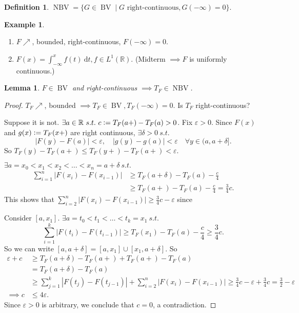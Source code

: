 \documentclass{report}
\newcommand{\R}{\mathbb{R}}
\newcommand{\st}{\ s.t.\ }
\def \BV {\operatorname{BV}}
\def \NBV {\operatorname{NBV}}
\newcommand{\df}{\ \mathrm{d}}
\newcommand{\defeq}{\vcentcolon=}
\newtheorem{lemma}[theorem]{Lemma}
\theoremstyle{definition}
\newtheorem{definition}[theorem]{Definition}
\newtheorem{example}[theorem]{Example}
\theoremstyle{remark}
\newcommand{\fnl}{\parbox[t]{0\linewidth}{}}
\begin{document}
\begin{definition}
	$\NBV = \{G \in \BV \mid G \text{ right-continuous}, G(-\infty) = 0\}$.
\end{definition}
\begin{example}\fnl
	\begin{enumerate}
		\item $F \nearrow$, bounded, right-continuous, $F(-\infty) = 0$.
		\item $F(x) = \int_{-\infty}^x f(t)\df t, f \in L^1(\R)$. (Midterm $\implies F$ is uniformly continuous.)
	\end{enumerate}
\end{example}
\begin{lemma}
	$F \in \operatorname{BV}$ and right-continuous $\implies T_F \in \operatorname{NBV}$.
\end{lemma}
\begin{proof}
	$T_F \nearrow$, bounded $\implies T_F \in \operatorname{BV}, T_F(-\infty) = 0$. Is $T_F$ right-continuous?

	Suppose it is not. $\exists a \in \R \st c \defeq T_F(a+) - T_F(a) > 0$. Fix $\varepsilon > 0$. Since $F(x)$ and $g(x) \defeq T_F(x+)$ are right continuous, $\exists \delta > 0 \st$ \[
		|F(y) - F(a)| < \varepsilon, \quad |g(y) - g(a)| < \varepsilon\quad \forall y \in (a, a + \delta].
	\]
	So $T_F(y) - T_F(a+) \leq T_F(y+) - T_F(a+) < \varepsilon$.

	$\exists a = x_0 < x_1 < x_2 < \ldots < x_n = a + \delta \st$
	\begin{align*}
		\sum_{i=1}^n |F(x_i) - F(x_{i-1})| & \geq T_F(a + \delta) - T_F(a) - \frac{c}{4} \\
		& \geq T_F(a+) - T_F(a) - \frac{c}{4} = \frac{3}{4}c.
	\end{align*} 
	This shows that $\sum_{i=2}^n |F(x_i) - F(x_{i-1})| \geq \frac{3}{4}c - \varepsilon$ since

	Consider $[a, x_1]$. $\exists a = t_0 < t_1 < \ldots < t_k = x_1 \st$ \[
		\sum_{i=1}^k |F(t_i) - F(t_{i-1})| \geq T_F(x_1) - T_F(a) - \frac{c}{4} \geq \frac{3}{4}c.
	\]
	So we can write $[a, a + \delta] = [a, x_1] \cup [x_1, a + \delta]$. So \begin{align*}
		\varepsilon + c & \geq T_F(a + \delta) - T_F(a+) + T_F(a+) - T_F(a) \\
						& = T_F(a + \delta) - T_F(a) \\
						& \geq \sum_{j=1}^k |F(t_j) - F(t_{j-1})| + \sum_{i=2}^n |F(x_i) - F(x_{i-1})| \geq \frac{3}{4}c - \varepsilon + \frac{3}{4}c = \frac{3}{2} - \varepsilon \\
		\implies c & \leq 4\varepsilon.
	\end{align*}
	Since $\varepsilon > 0$ is arbitrary, we conclude that $c = 0$, a contradiction.
\end{proof}
\end{document}
